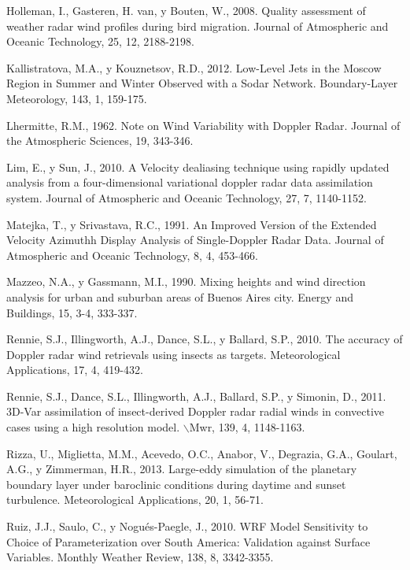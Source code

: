 \documentclass[12pt,spanish,oneside]{book}
\begin{document}
\hypertarget{ref-Holleman2008}{}
Holleman, I., Gasteren, H. van, y Bouten, W., 2008. Quality assessment
of weather radar wind profiles during bird migration. Journal of
Atmospheric and Oceanic Technology, 25, 12, 2188-2198.

\hypertarget{ref-Kallistratova2012}{}
Kallistratova, M.A., y Kouznetsov, R.D., 2012. Low-Level Jets in the
Moscow Region in Summer and Winter Observed with a Sodar Network.
Boundary-Layer Meteorology, 143, 1, 159-175.

\hypertarget{ref-Lhermitte1962}{}
Lhermitte, R.M., 1962. Note on Wind Variability with Doppler Radar.
Journal of the Atmospheric Sciences, 19, 343-346.

\hypertarget{ref-Lim2010}{}
Lim, E., y Sun, J., 2010. A Velocity dealiasing technique using rapidly
updated analysis from a four-dimensional variational doppler radar data
assimilation system. Journal of Atmospheric and Oceanic Technology, 27,
7, 1140-1152.

\hypertarget{ref-Matejka1991}{}
Matejka, T., y Srivastava, R.C., 1991. An Improved Version of the
Extended Velocity Azimuthh Display Analysis of Single-Doppler Radar
Data. Journal of Atmospheric and Oceanic Technology, 8, 4, 453-466.

\hypertarget{ref-Mazzeo1990}{}
Mazzeo, N.A., y Gassmann, M.I., 1990. Mixing heights and wind direction
analysis for urban and suburban areas of Buenos Aires city. Energy and
Buildings, 15, 3-4, 333-337.

\hypertarget{ref-Rennie2010}{}
Rennie, S.J., Illingworth, A.J., Dance, S.L., y Ballard, S.P., 2010. The
accuracy of Doppler radar wind retrievals using insects as targets.
Meteorological Applications, 17, 4, 419-432.

\hypertarget{ref-Rennie2011}{}
Rennie, S.J., Dance, S.L., Illingworth, A.J., Ballard, S.P., y Simonin,
D., 2011. 3D-Var assimilation of insect-derived Doppler radar radial
winds in convective cases using a high resolution model.
\(\backslash\)Mwr, 139, 4, 1148-1163.

\hypertarget{ref-Rizza2013}{}
Rizza, U., Miglietta, M.M., Acevedo, O.C., Anabor, V., Degrazia, G.A.,
Goulart, A.G., y Zimmerman, H.R., 2013. Large-eddy simulation of the
planetary boundary layer under baroclinic conditions during daytime and
sunset turbulence. Meteorological Applications, 20, 1, 56-71.

\hypertarget{ref-Ruiz2010}{}
Ruiz, J.J., Saulo, C., y Nogués-Paegle, J., 2010. WRF Model Sensitivity
to Choice of Parameterization over South America: Validation against
Surface Variables. Monthly Weather Review, 138, 8, 3342-3355.
\end{document}

